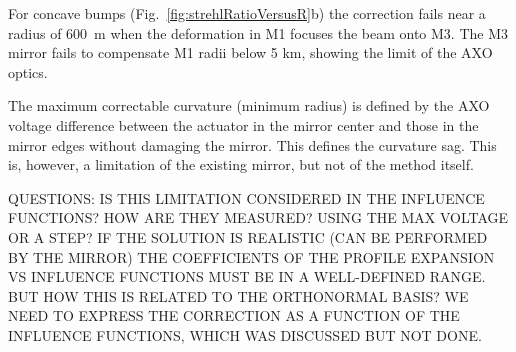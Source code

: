 \documentclass{iucr}
\newcommand{\todo}[1]{{\color{red}[TODO: "#1'']}}
\newcommand{\inblue}[1]{{\color{blue}#1}}
\newcommand{\inred}[1]{{\color{red}#1}}
\newcommand{\ingreen}[1]{{\color{green}#1}}
\begin{document}
For concave bumps (Fig.~\ref{fig:strehlRatioVersusR}b) the correction fails near a radius of 600~m when the deformation in M1 focuses the beam onto M3. The M3 mirror fails to compensate M1 radii below 5 km, showing the limit of the AXO optics.


\inred{The maximum correctable curvature (minimum radius) is defined by the AXO voltage difference between the actuator in the mirror center and those in the mirror edges without damaging the mirror. This defines the curvature sag. This is, however, a limitation of the existing mirror, but not of the method itself.}

\ingreen{QUESTIONS: IS THIS LIMITATION CONSIDERED IN THE INFLUENCE FUNCTIONS? HOW ARE THEY MEASURED? USING THE MAX VOLTAGE OR A STEP? IF THE SOLUTION IS REALISTIC (CAN BE PERFORMED BY THE MIRROR) THE COEFFICIENTS OF THE PROFILE EXPANSION VS INFLUENCE FUNCTIONS MUST BE IN A WELL-DEFINED RANGE. BUT HOW THIS IS RELATED TO THE ORTHONORMAL BASIS? WE NEED TO EXPRESS THE CORRECTION AS A FUNCTION OF THE INFLUENCE FUNCTIONS, WHICH WAS DISCUSSED BUT NOT DONE.}

 
 
\end{document}
